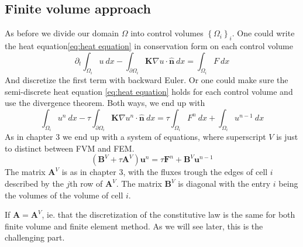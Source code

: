 \documentclass[../Main/main.tex]{subfiles}
\begin{document}
	\subsection*{Finite volume approach}
	As before we divide our domain $\Omega$ into control volumes $\left \{ \Omega_i \right \}_i$. One could write the heat equation\eqref{eq:heat equation} in conservation form on each control volume
	\begin{equation}
		\partial_t\int_{\Omega_i}u \ dx -\int_{\partial \Omega_i} \pmb{K}\nabla u \cdot \hat{\pmb{n}}\ dx = \int_{\Omega_i} F \ dx
	\end{equation}
	And discretize the first term with backward Euler. Or one could make sure the semi-discrete heat equation \eqref{eq:heat equation} holds for each control volume and use the divergence theorem. Both ways, we end up with
	\begin{equation}
		\int_{\Omega_i} u^n \ dx - \tau\int_{\partial \Omega_i} \pmb{K}\nabla u^n \cdot \hat{\pmb{n}}\ dx = \tau \int_{\Omega_i} F^n \ dx + \int_{\Omega_i} u^{n-1} \ dx
	\end{equation}
	As in chapter 3 we end up with a system of equations, where superscript $V$ is just to distinct between FVM and FEM.
	\begin{equation}\label{eq:heat fvm disc}
		(\pmb{B}^V + \tau \pmb{A}^V)\pmb{u}^n = \tau \pmb{F}^n + \pmb{B}^V\pmb{u}^{n-1}
	\end{equation}
	The matrix $\pmb{A}^V$ is as in chapter 3, with the fluxes trough the edges of cell $i$ described by the $j$th row of $\pmb{A}^V$. The matrix $\pmb{B}^V$ is diagonal with the entry $i$ being the volumes of the volume of cell $i$.

	If $\pmb{A}= \pmb{A}^V$, ie. that the discretization of the constitutive law is the same for both finite volume and finite element method. As we will see later, this is the challenging part.	
	
\end{document}
